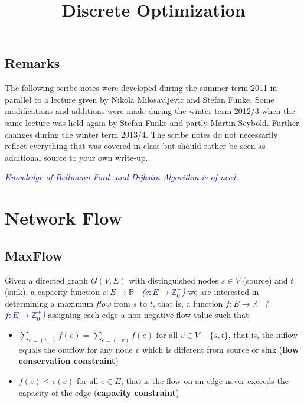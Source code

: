 \documentclass{article}
\begin{document}
\title{Discrete Optimization}
\maketitle

\tableofcontents
\newpage

\vfill
\subsection*{Remarks}
The following scribe notes were developed during the summer term 2011
in parallel to a lecture given by Nikola Milosavljevic and Stefan Funke.
Some modifications and additions were made during the winter term 2012/3 when the
same lecture was held again by Stefan Funke and partly Martin Seybold. Further
changes during the winter term 2013/4. 
The scribe notes do not necessarily reflect everything that was covered in class
but should rather be seen as additional source to your own write-up.

\textcolor{blue}{\emph{Knowledge of Bellmann-Ford- and Dijkstra-Algorithm is of need.}}


\newpage

\section{Network Flow}
\subsection{MaxFlow}
Given a directed graph $G(V,E)$ with distinguished nodes $s\in V$ (source) and $t$ (sink), a capacity function $c:E\rightarrow \mathbb{R}^+$ \textcolor{blue}{\emph{($c:E\rightarrow \mathbb{Z}^+_0$)}} we are interested in determining a maximum \emph{flow} from $s$ to $t$, that is, a function $f:E\rightarrow \mathbb{R}^+$ \textcolor{blue}{\emph{($f:E\rightarrow \mathbb{Z}^+_0$)}} assigning each edge a
non-negative flow value such that:
\begin{itemize}
\item $\displaystyle \sum_{e=(v,.)} f(e)=\sum_{e=(.,v)} f(e)$ for all $v\in V-\{s,t\}$, that is, the inflow equals the outflow for any node $v$ which is different from source or sink ({\bf flow conservation constraint})
\item $f(e)\leq c(e)$ for all $e\in E$, that is the flow on an edge never exceeds the capacity of the edge ({\bf capacity constraint})
\end{itemize}
\end{document}
